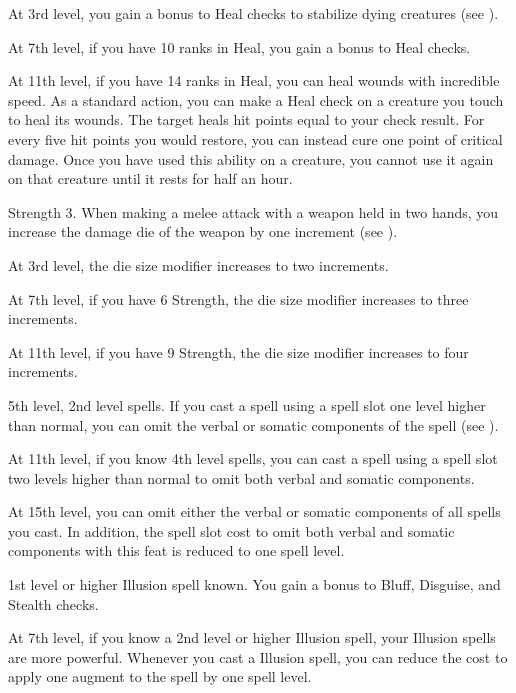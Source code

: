     At 3rd level, you gain a  bonus to Heal checks to stabilize dying creatures (see ).

    At 7th level, if you have 10 ranks in Heal, you gain a  bonus to Heal checks.

    At 11th level, if you have 14 ranks in Heal, you can heal wounds with incredible speed.
    As a standard action, you can make a Heal check on a creature you touch to heal its wounds.
    The target heals hit points equal to your check result.
    For every five hit points you would restore, you can instead cure one point of critical damage.
    Once you have used this ability on a creature, you cannot use it again on that creature until it rests for half an hour.

    \featpre Strength 3.
    \featben When making a melee attack with a weapon held in two hands, you increase the damage die of the weapon by one increment (see ).

    At 3rd level, the die size modifier increases to two increments.

    At 7th level, if you have 6 Strength, the die size modifier increases to three increments.

    At 11th level, if you have 9 Strength, the die size modifier increases to four increments.

    \featpre 5th level, 2nd level spells.
    \featben If you cast a spell using a spell slot one level higher than normal, you can omit the verbal or somatic components of the spell (see ).

    At 11th level, if you know 4th level spells, you can cast a spell using a spell slot two levels higher than normal to omit both verbal and somatic components.

    At 15th level, you can omit either the verbal or somatic components of all spells you cast.
    In addition, the spell slot cost to omit both verbal and somatic components with this feat is reduced to one spell level.

    \featpre 1st level or higher Illusion spell known.
    \featben You gain a  bonus to Bluff, Disguise, and Stealth checks.

    At 7th level, if you know a 2nd level or higher Illusion spell, your Illusion spells are more powerful.
    Whenever you cast a Illusion spell, you can reduce the cost to apply one augment to the spell by one spell level.

